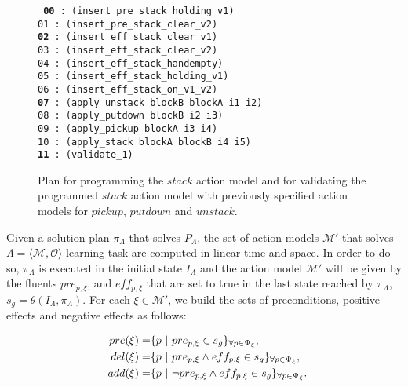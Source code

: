\documentclass[runningheads]{llncs}
\newcommand{\tup}[1]{{\langle #1 \rangle}}
\begin{document}
\begin{figure}[hbt!]
	{\footnotesize\tt
		{\bf 00} : (insert\_pre\_stack\_holding\_v1) \\
		01 : (insert\_pre\_stack\_clear\_v2)\\
		{\bf 02} : (insert\_eff\_stack\_clear\_v1)\\
		03 : (insert\_eff\_stack\_clear\_v2)\\
		04 : (insert\_eff\_stack\_handempty)\\
		05 : (insert\_eff\_stack\_holding\_v1)\\
		06 : (insert\_eff\_stack\_on\_v1\_v2)\\
		{\bf 07} : (apply\_unstack blockB blockA i1 i2)\\
		08 : (apply\_putdown blockB i2 i3)\\
		09 : (apply\_pickup blockA i3 i4)\\
		10 : (apply\_stack blockA blockB i4 i5)\\
		{\bf 11} : (validate\_1)
	}
	\caption{\small Plan for programming the $stack$ action model and for validating the programmed $stack$ action model with previously specified action models for $pickup$, $putdown$ and $unstack$.}
	\label{fig:plan-lplan}
\end{figure}

Given a solution plan $\pi_\Lambda$ that solves $P_{\Lambda}$, the set of action models $\mathcal{M}'$ that solves $\Lambda=\tup{\mathcal{M},\mathcal{O}}$ learning task are computed in linear time and space. In order to do so, $\pi_\Lambda$ is executed in the initial state $I_{\Lambda}$ and the action model $\mathcal{M}'$ will be given by the fluents $pre_{p,\xi}$, and $eff_{p,\xi}$ that are set to true in the last state reached by $\pi_\Lambda$, $s_g=\theta(I_\Lambda,\pi_\Lambda)$. For each $\xi \in \mathcal{M'}$, we build the sets of preconditions, positive effects and negative effects as follows:

\begin{small}
	\begin{align*}
	  \hspace*{7pt}pre(\xi)=& \{p ~|~ pre_{p,\xi} \in s_g\}_{\forall p \in \Psi_\xi},\\
	  \hspace*{7pt}del(\xi)=& \{p ~|~ pre_{p,\xi} \wedge eff_{p,\xi} \in s_g\}_{\forall p \in \Psi_\xi},\\
	  \hspace*{7pt}add(\xi)=& \{p ~|~ \neg pre_{p,\xi} \wedge eff_{p,\xi} \in s_g\}_{\forall p \in \Psi_\xi}.
	\end{align*}
\end{small}
\end{document}
